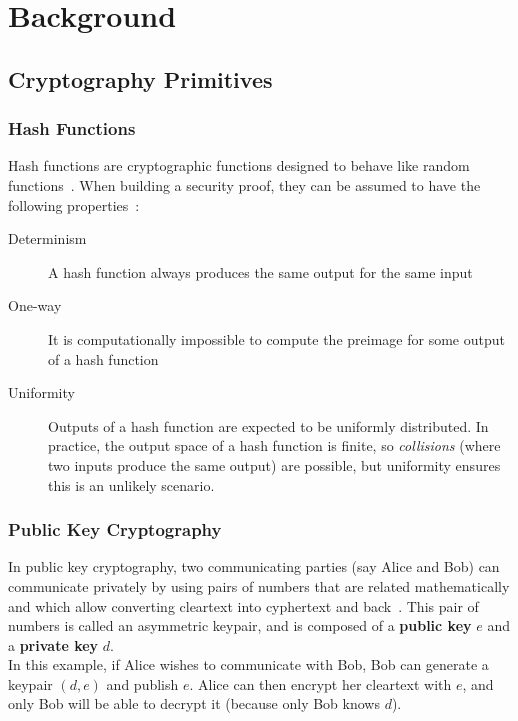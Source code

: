 \chapter{Background}\label{ch:background}


\section{Cryptography Primitives}\label{sec:cryptography}

\subsection{Hash Functions}\label{subsec:crypto:hash}

Hash functions are cryptographic functions designed to behave like random
functions~\cite{smart2016randomOracleModel}.
When building a security proof, they can be assumed to have the following properties~\cite{smart2016randomOracleModel,
    smart2016hashFunctions}:
\begin{description}
    \item[Determinism] A hash function always produces the same output for the same input
    \item[One-way] It is computationally impossible to compute the preimage for some output of a hash function
    \item[Uniformity] Outputs of a hash function are expected to be uniformly distributed.
    In practice, the output space of a hash function is finite, so \textit{collisions} (where two inputs produce the
    same output) are possible, but uniformity ensures this is an unlikely scenario.
\end{description}

\subsection{Public Key Cryptography}\label{subsec:crypto:pubkey}

In public key cryptography, two communicating parties (say Alice and Bob) can communicate privately by using pairs of
numbers that are related mathematically and which allow converting cleartext into cyphertext and
back~\cite{smart2016publicKey}.
This pair of numbers is called an asymmetric keypair, and is composed of a \textbf{public key} $e$ and a \textbf{private
key} $d$.\\

In this example, if Alice wishes to communicate with Bob, Bob can generate a keypair $(d, e)$ and publish $e$.
Alice can then encrypt her cleartext with $e$, and only Bob will be able to decrypt it (because only Bob knows $d$).

